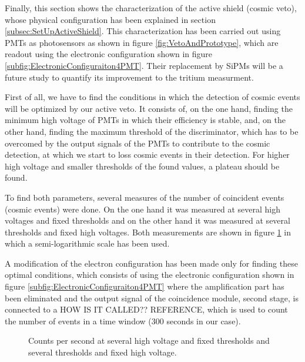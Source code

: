 Finally, this section shows the characterization of the active shield (cosmic veto), whose physical configuration has been explained in section \ref{subsec:SetUpActiveShield}. This characterization has been carried out using PMTs as photosensors as shown in figure \ref{fig:VetoAndPrototype}, which are readout using the electronic configuration shown in figure \ref{subfig:ElectronicConfiguraiton4PMT}. Their replacement by SiPMs will be a future study to quantify its improvement to the tritium measurment. 

First of all, we have to find the conditions in which the detection of cosmic events will be optimized by our active veto. It consists of, on the one hand, finding the minimum high voltage of PMTs in which their efficiency is stable, and, on the other hand, finding the maximum threshold of the discriminator, which has to be overcomed by the output signals of the PMTs to contribute to the cosmic detection, at which we start to loss cosmic events in their detection. For higher high voltage and smaller thresholds of the found values, a plateau should be found.

To find both parameters, several measures of the number of coincident events (cosmic events) were done. On the one hand it was measured at several high voltages and fixed thresholds and on the other hand it was measured at several thresholds and fixed high voltages. Both measurements are shown in figure \ref{fig:HVandThresholdsPLateaus} in which a semi-logarithmic scale has been used.

A modification of the electron configuration has been made only for finding these optimal conditions, which consists of using the electronic configuration shown in figure \ref{subfig:ElectronicConfiguraiton4PMT} where the amplification part has been eliminated and the output signal of the coincidence module, second stage, is connected to a HOW IS IT CALLED?? REFERENCE, which is used to count the number of events in a time window ($300$ seconds in our case).

\begin{figure}[]
 \centering
    \newline
 \caption{Counts per second at several high voltage and fixed thresholds and several thresholds and fixed high voltage.}
 \label{fig:HVandThresholdsPLateaus}
\end{figure}

